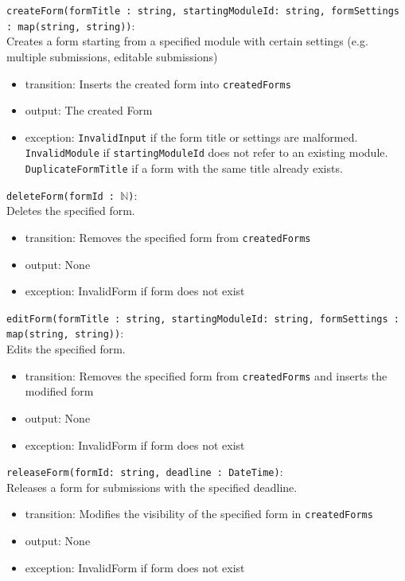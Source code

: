 \documentclass[12pt, titlepage]{article}
\begin{document}
\noindent \texttt{createForm(formTitle : string, startingModuleId: string,  \newline formSettings : map(string, string))}: \\
Creates a form starting from a specified module with certain settings (e.g. multiple submissions, editable submissions)
\begin{itemize}
\item transition: Inserts the created form into \texttt{createdForms}
\item output: The created Form
\item exception: \texttt{InvalidInput} if the form title or settings are malformed. \texttt{InvalidModule} if \texttt{startingModuleId} does not refer to an existing module. \texttt{DuplicateFormTitle} if a form with the same title already exists.
\end{itemize}

\noindent \texttt{deleteForm(formId : $\mathbb{N}$)}: \\
Deletes the specified form.
\begin{itemize}
\item transition: Removes the specified form from \texttt{createdForms}
\item output: None
\item exception: InvalidForm if form does not exist
\end{itemize}

\noindent \texttt{editForm(formTitle : string, startingModuleId: string,  \newline formSettings : map(string, string))}: \\
Edits the specified form.
\begin{itemize}
\item transition: Removes the specified form from \texttt{createdForms} and inserts the modified form
\item output: None
\item exception: InvalidForm if form does not exist
\end{itemize}

\noindent \texttt{releaseForm(formId: string, deadline : DateTime)}: \\
Releases a form for submissions with the specified deadline.
\begin{itemize}
\item transition: Modifies the visibility of the specified form in \texttt{createdForms}
\item output: None
\item exception: InvalidForm if form does not exist
\end{itemize}
\end{document}

